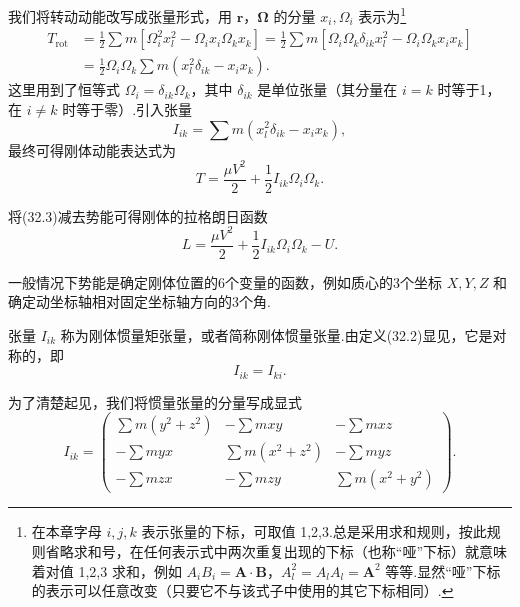 我们将转动动能改写成张量形式，用 $\boldsymbol{r}$，$\boldsymbol{\Omega}$ 的分量 $x_i,\Omega_i$ 表示为\footnote{在本章字母 $i,j,k$ 表示张量的下标，可取值 1,2,3.总是采用求和规则，按此规则省略求和号，在任何表示式中两次重复出现的下标（也称“哑”下标）就意味着对值 1,2,3 求和，例如 $A_iB_i=\boldsymbol{A}\cdot\boldsymbol{B}$，$A_l^2=A_lA_l=\boldsymbol{A}^2$ 等等.显然“哑”下标的表示可以任意改变（只要它不与该式子中使用的其它下标相同）.}
\begin{equation*}
\begin{aligned}
  T_{\mathrm{rot}}&=\frac{1}{2}\sum m\left[\Omega_i^2x_l^2-\Omega_i x_i\Omega_k x_k\right]
  =\frac{1}{2}\sum m\left[\Omega_i\Omega_k\delta_{ik}x_l^2-\Omega_i\Omega_k x_i x_k\right]\\
  &=\frac{1}{2}\Omega_i\Omega_k\sum m\left(x_l^2\delta_{ik}-x_i x_k\right).
\end{aligned}
\end{equation*}
这里用到了恒等式 $\Omega_i=\delta_{ik}\Omega_k$，其中 $\delta_{ik}$ 是单位张量（其分量在 $i=k$ 时等于1，在 $i\neq k$ 时等于零）.引入张量
\begin{equation}
  I_{ik}=\sum m\left(x_l^2\delta_{ik}-x_i x_k\right),
\end{equation}
最终可得刚体动能表达式为
\begin{equation}
  T=\frac{\mu V^2}{2}+\frac{1}{2}I_{ik}\Omega_i\Omega_k.
\end{equation}

将(32.3)减去势能可得刚体的拉格朗日函数
\begin{equation}
  L=\frac{\mu V^2}{2}+\frac{1}{2}I_{ik}\Omega_i\Omega_k-U.
\end{equation}

一般情况下势能是确定刚体位置的6个变量的函数，例如质心的3个坐标 $X,Y,Z$ 和确定动坐标轴相对固定坐标轴方向的3个角.

张量 $I_{ik}$ 称为刚体惯量矩张量，或者简称刚体惯量张量.由定义(32.2)显见，它是对称的，即
\begin{equation}
  I_{ik}=I_{ki}.
\end{equation}

为了清楚起见，我们将惯量张量的分量写成显式
\begin{equation}
  I_{ik}=\begin{pmatrix}
  \sum m\left(y^2+z^2\right) & -\sum mxy & -\sum mxz\\
  -\sum myx & \sum m\left(x^2+z^2\right) & -\sum myz\\
  -\sum mzx & -\sum mzy & \sum m\left(x^2+y^2\right)
  \end{pmatrix}.
\end{equation}


